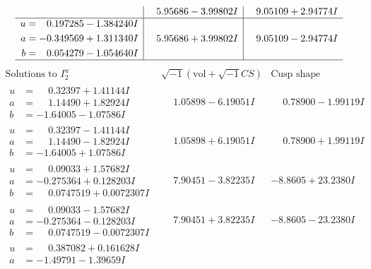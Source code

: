 \documentclass[1p]{elsarticle_modified}
\theoremstyle{definition}
\newcommand{\I}{\sqrt{-1}}
\begin{document}
$$\begin{array}{c|c|c}
 & \phantom{-}5.95686 - 3.99802 I & \phantom{-}9.05109 + 2.94774 I \\ \hline\begin{aligned}
u &= \phantom{-}0.197285 - 1.384240 I \\
a &= -0.349569 + 1.311340 I \\
b &= \phantom{-}0.054279 - 1.054640 I\end{aligned}
 & \phantom{-}5.95686 + 3.99802 I & \phantom{-}9.05109 - 2.94774 I\\
 \hline 
 \end{array}$$\newpage$$\begin{array}{c|c|c}  
\text{Solutions to }I^u_{2}& \I (\text{vol} + \sqrt{-1}CS) & \text{Cusp shape}\\
 \hline 
\begin{aligned}
u &= \phantom{-}0.32397 + 1.41144 I \\
a &= \phantom{-}1.14490 + 1.82924 I \\
b &= -1.64005 - 1.07586 I\end{aligned}
 & \phantom{-}1.05898 - 6.19051 I & \phantom{-}0.78900 - 1.99119 I \\ \hline\begin{aligned}
u &= \phantom{-}0.32397 - 1.41144 I \\
a &= \phantom{-}1.14490 - 1.82924 I \\
b &= -1.64005 + 1.07586 I\end{aligned}
 & \phantom{-}1.05898 + 6.19051 I & \phantom{-}0.78900 + 1.99119 I \\ \hline\begin{aligned}
u &= \phantom{-}0.09033 + 1.57682 I \\
a &= -0.275364 + 0.128203 I \\
b &= \phantom{-}0.0747519 + 0.0072307 I\end{aligned}
 & \phantom{-}7.90451 - 3.82235 I & -8.8605 + 23.2380 I \\ \hline\begin{aligned}
u &= \phantom{-}0.09033 - 1.57682 I \\
a &= -0.275364 - 0.128203 I \\
b &= \phantom{-}0.0747519 - 0.0072307 I\end{aligned}
 & \phantom{-}7.90451 + 3.82235 I & -8.8605 - 23.2380 I \\ \hline\begin{aligned}
u &= \phantom{-}0.387082 + 0.161628 I \\
a &= -1.49791 - 1.39659 I \\

\end{aligned}
\end{array}$$
\end{document}
